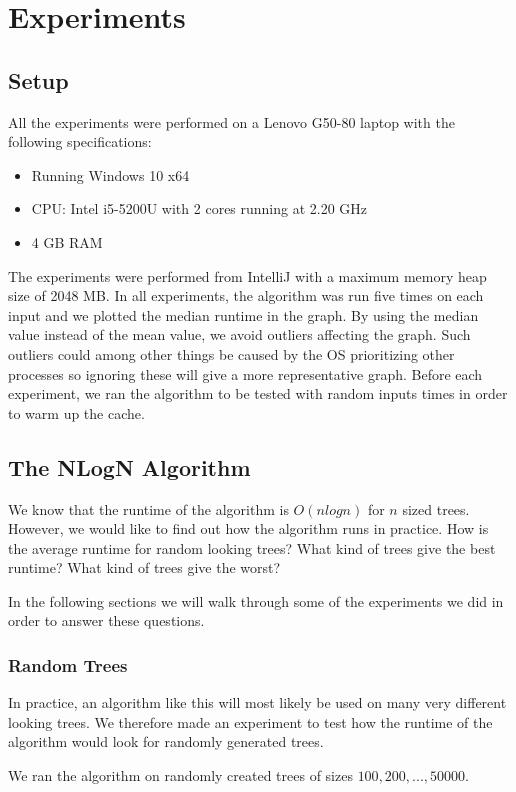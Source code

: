\chapter{Experiments}
\section{Setup}
All the experiments were performed on a Lenovo G50-80 laptop with the following specifications:

\begin{itemize}
	\item Running Windows 10 x64
	\item CPU: Intel i5-5200U with 2 cores running at 2.20 GHz
	\item 4 GB RAM
\end{itemize}

The experiments were performed from IntelliJ with a maximum memory heap size of 2048 MB.
In all experiments, the algorithm was run five times on each input and we plotted the median runtime in the graph. By using the median value instead of the mean value, we avoid outliers affecting the graph. Such outliers could among other things be caused by the OS prioritizing other processes so ignoring these will give a more representative graph. Before each experiment, we ran the algorithm to be tested with random inputs  times in order to warm up the cache.

\section{The NLogN Algorithm}
We know that the runtime of the algorithm is $O(nlogn)$ for $n$ sized trees. However, we would like to find out how the algorithm runs in practice. How is the average runtime for random looking trees? What kind of trees give the best runtime? What kind of trees give the worst?

In the following sections we will walk through some of the experiments we did in order to answer these questions.

\subsection{Random Trees}
In practice, an algorithm like this will most likely be used on many very different looking trees. We therefore made an experiment to test how the runtime of the algorithm would look for randomly generated trees.

We ran the algorithm on randomly created trees of sizes $100, 200, ..., 50000$.


